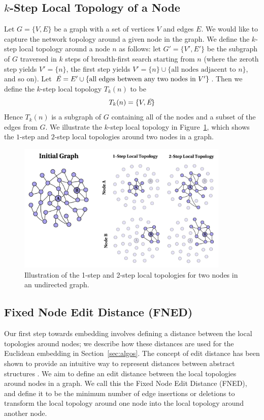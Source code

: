 \documentclass{article}
\begin{document}
\subsection{$k$-Step Local Topology of a Node}
Let $G = \{V,E\}$ be a graph with a set of vertices $V$ and edges $E$. We would like to capture the network topology around a given node in the graph. We define the $k$-step local topology around a node $n$ as follows: let $G' = \{ V',E' \}$ be the subgraph of $G$ traversed in $k$ steps of breadth-first search starting from $n$ (where the zeroth step yields $V' = \{ n \}$, the first step yields $V' = \{ n \} \cup \{ \text{all nodes adjacent to } n \} $, and so on). Let $ \text{\emph{\~{E}}} = E' \cup \{\text{all edges between any two nodes in } V' \}$. Then we define the $k$-step local topology $T_{k}(n)$ to be
\begin{equation}
T_{k}(n) = \{ V, \emph{\text{\~{E}}} \}
\end{equation}
Hence $T_{k}(n)$ is a subgraph of $G$ containing all of the nodes and a subset of the edges from $G$. We illustrate the $k$-step local topology in Figure~\ref{fig:localTopology}, which shows the $1$-step and $2$-step local topologies around two nodes in a graph.
\begin{figure}[h!tbp]
  \centering               
  \includegraphics[width=0.9\textwidth]{fig/fig1.pdf}
  \caption{Illustration of the 1-step and 2-step local topologies for two nodes in an undirected graph.}
  \label{fig:localTopology}
\end{figure}

\subsection{Fixed Node Edit Distance (FNED)}
Our first step towards embedding involves defining a distance between the local topologies around nodes; we describe how these distances are used for the Euclidean embedding in Section~\ref{sec:algos}. The concept of edit distance has been shown to provide an intuitive way to represent distances between abstract structures \cite{riesen2009approximate,reis2004automatic,gao2010survey}. We aim to define an edit distance between the local topologies around nodes in a graph. We call this the Fixed Node Edit Distance (FNED), and define it to be the minimum number of edge insertions or deletions to transform the local topology around one node into the local topology around another node.
\end{document}

